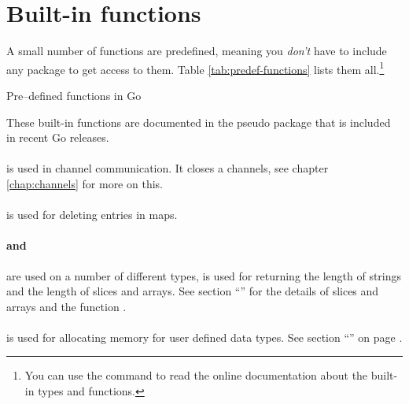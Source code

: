 \section{Built-in functions}
A small number of functions are predefined, meaning 
you \emph{don't} have to include any package to get
access to them. Table \ref{tab:predef-functions} lists them all.\footnote{You can use the
command  to read the online documentation about the built-in types and functions.}

\begin{table}[H]
\begin{center}
\caption{Pre--defined functions in Go}
\label{tab:predef-functions}

\end{center}
\end{table}

These built-in functions are documented in the  
pseudo package that is included in recent Go releases.

\paragraph{} is used in
channel communication. It closes a channels, see chapter \ref{chap:channels}
for more on this.

\paragraph{} is used for deleting entries in maps.

\paragraph{ and } are used on a number of different
types,  is
used for returning the length of strings and the length of slices and
arrays. See section ``'' for the details of slices and
arrays and the function
.

\paragraph{} is used for allocating memory for user defined
data types. See section ``'' on page
\pageref{sec:allocation with new}.

